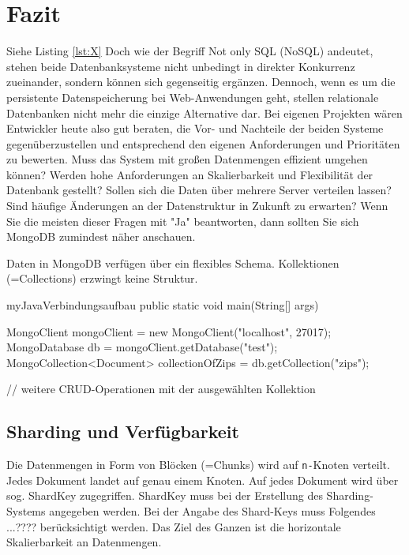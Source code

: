\section{Fazit}
Siehe Listing \ref{lst:X} \newline 
Doch wie der Begriff Not only SQL (NoSQL) andeutet, stehen beide Datenbanksysteme nicht unbedingt in direkter Konkurrenz zueinander, sondern können sich gegenseitig ergänzen. Dennoch, wenn es um die persistente Datenspeicherung bei Web-Anwendungen geht, stellen relationale Datenbanken nicht mehr die einzige Alternative dar. Bei eigenen Projekten wären Entwickler heute also gut beraten, die Vor- und Nachteile der beiden Systeme gegenüberzustellen und entsprechend den eigenen Anforderungen und Prioritäten zu bewerten. Muss das System mit großen Datenmengen effizient umgehen können? Werden hohe Anforderungen an Skalierbarkeit und Flexibilität der Datenbank gestellt? Sollen sich die Daten über mehrere Server verteilen lassen? Sind häufige Änderungen an der Datenstruktur in Zukunft zu erwarten? Wenn Sie die meisten dieser Fragen mit "Ja" beantworten, dann sollten Sie sich MongoDB zumindest näher anschauen.\newline\newline

Daten in MongoDB verfügen über ein flexibles Schema. Kollektionen (=Collections) erzwingt keine Struktur.

\begin{listingsboxJava}[label={lst:conn}]{myJava}{Verbindungsaufbau}
public static void main(String[] args) {

	MongoClient mongoClient = new MongoClient("localhost", 27017);
        MongoDatabase db = mongoClient.getDatabase("test");
        MongoCollection<Document> collectionOfZips = db.getCollection("zips");
        
        // weitere CRUD-Operationen mit der ausgewählten Kollektion
}
\end{listingsboxJava}
\subsection{Sharding und Verfügbarkeit}
Die Datenmengen in Form von Blöcken (=Chunks) wird auf \texttt{n-}Knoten verteilt. Jedes Dokument landet auf genau einem Knoten. Auf jedes Dokument wird über sog. ShardKey zugegriffen. ShardKey muss bei der Erstellung des Sharding-Systems angegeben werden. Bei der Angabe des Shard-Keys muss Folgendes ...???? berücksichtigt werden. Das Ziel des Ganzen ist die horizontale Skalierbarkeit an Datenmengen.



